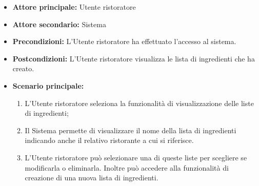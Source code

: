 \label{usecase:Visualizzazione delle lista ingredienti}
\begin{itemize}
	\item \textbf{Attore principale:} Utente ristoratore
	
	\item \textbf{Attore secondario:} Sistema

	\item \textbf{Precondizioni:} L'Utente ristoratore ha effettuato l'accesso
	      al sistema.

	\item \textbf{Postcondizioni:}
	      L'Utente ristoratore visualizza le lista di ingredienti che ha creato.

	\item \textbf{Scenario principale:}
	      \begin{enumerate}
		      \item L'Utente ristoratore seleziona la funzionalità di
		            visualizzazione delle liste di ingredienti;

		      \item Il Sistema permette di visualizzare il nome della lista di ingredienti 
			  indicando anche il relativo ristorante a cui si riferisce.

			  \item L'Utente ristoratore può selezionare una di queste liste per scegliere se 
			  modificarla o eliminarla.
			  Inoltre può accedere alla funzionalità di creazione di una nuova lista di ingredienti.
	      \end{enumerate}
\end{itemize}
